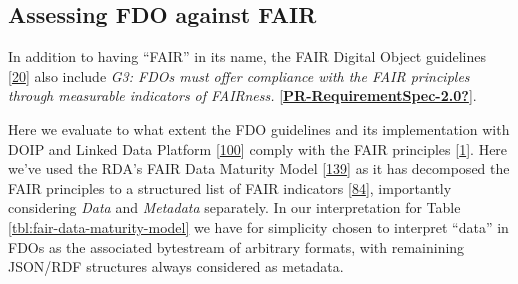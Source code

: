 \hypertarget{sec:fair-compare}{%
\subsection{Assessing FDO against FAIR}\label{sec:fair-compare}}

In addition to having ``FAIR'' in its name, the FAIR Digital Object guidelines {[}\protect\hyperlink{ref-RwvirqWg}{20}{]} also include \emph{G3: FDOs must offer compliance with the FAIR principles through measurable indicators of FAIRness.} {[}\protect\hyperlink{ref-PR-RequirementSpec-2.0}{\textbf{PR-RequirementSpec-2.0?}}{]}.

Here we evaluate to what extent the FDO guidelines and its implementation with DOIP and Linked Data Platform {[}\protect\hyperlink{ref-7szz7dwO}{100}{]} comply with the FAIR principles {[}\protect\hyperlink{ref-6DjakjNS}{1}{]}. Here we've used the RDA's FAIR Data Maturity Model {[}\protect\hyperlink{ref-1GrKTFaK2}{139}{]} as it has decomposed the FAIR principles to a structured list of FAIR indicators {[}\protect\hyperlink{ref-UzQhqk0M}{84}{]}, importantly considering \emph{Data} and \emph{Metadata} separately. In our interpretation for Table \ref{tbl:fair-data-maturity-model} we have for simplicity chosen to interpret ``data'' in FDOs as the associated bytestream of arbitrary formats, with remainining JSON/RDF structures always considered as metadata.

